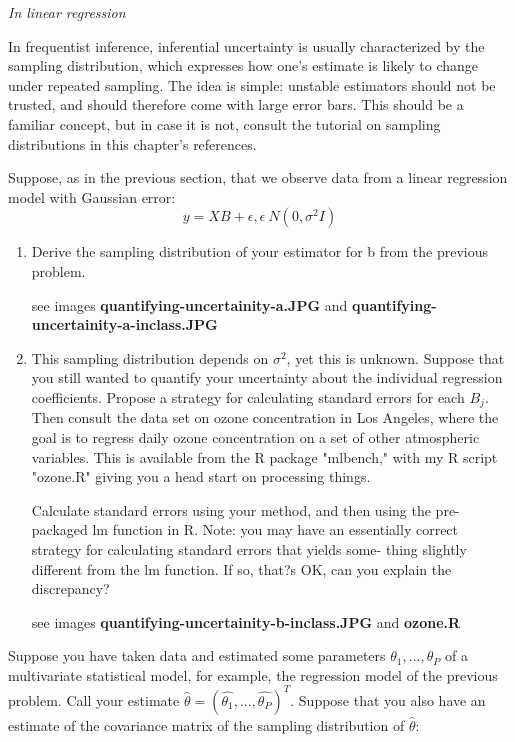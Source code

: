 \documentclass{homework}
\begin{document}
\par \noindent \textit{In linear regression}
\par \noindent In frequentist inference, inferential uncertainty is usually characterized by the sampling distribution, which expresses how one's estimate is likely to change under repeated sampling. The idea is simple: unstable estimators should not be trusted, and should therefore come with large error bars. This should be a familiar concept, but in case it is not, consult the tutorial on sampling distributions in this chapter's references.
\par \noindent Suppose, as in the previous section, that we observe data from a linear regression model with Gaussian error:
$$y = XB + \epsilon ,    \epsilon ~ N(0,\sigma^2I)$$

\begin{enumerate}[label=(\Alph*)]
\item Derive the sampling distribution of your estimator for b from the previous problem.
\par * see images \textbf{quantifying-uncertainity-a.JPG}  and \textbf{quantifying-uncertainity-a-inclass.JPG}

\item This sampling distribution depends on $\sigma^2$, yet this is unknown. Suppose that you still wanted to quantify your uncertainty about the individual regression coefficients. Propose a strategy for calculating standard errors for each $B_j$. Then consult the data set on ozone concentration in Los Angeles, where the goal is to regress daily ozone concentration on a set of other atmospheric variables. This is available from the R package "mlbench," with my R script "ozone.R" giving you a head start on processing things.
\par Calculate standard errors using your method, and then using the pre-packaged lm function in R. Note: you may have an essentially correct strategy for calculating standard errors that yields some- thing slightly different from the lm function. If so, that?s OK, can you explain the discrepancy?
\par * see images \textbf{quantifying-uncertainity-b-inclass.JPG}  and \textbf{ozone.R}

\end{enumerate}

Suppose you have taken data and estimated some parameters $\theta_1, . . . , \theta_P$ of a multivariate statistical model, for example, the regression model of the previous problem. Call your estimate $\hat{\theta} = (\hat{\theta_1}, . . . , \hat{\theta_P})^T$. Suppose that you also have an estimate of the covariance matrix of the sampling distribution of $\hat{\theta}$:
\end{document}
